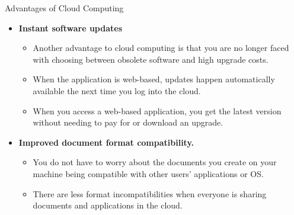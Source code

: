 \documentclass{SKP-beamer}
\begin{document}
\begin{frame}{Advantages of Cloud Computing}
	\begin{itemize}
		
		\item  \textbf{Instant software updates}
		\begin{itemize}
			\item  Another advantage to cloud computing is that you are no longer faced with choosing
			between obsolete software and high upgrade costs.
			\item  When the application is web-based, updates happen automatically available the next time 
			you log into the cloud.
			\item  When you access a web-based application, you get the latest version without needing to pay 
			for or download an upgrade.
			
		\end{itemize}
		\item  \textbf{Improved document format compatibility.}
		\begin{itemize}
			\item  You do not have to worry about the documents you create on your machine being 
			compatible with other users' applications or OS.
			\item  There are less format incompatibilities when everyone is sharing documents and 
			applications in the cloud.
			
		\end{itemize}
	\end{itemize}
\end{frame}
\end{document}
